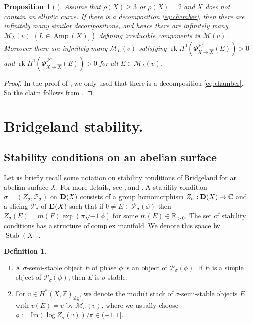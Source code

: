 \documentclass[10pt]{amsart}
\def\cal{\mathcal}
\def\Bbb{\mathbb}
\newcommand{\rk}{\operatorname{rk}}
\newcommand{\Amp}{\operatorname{Amp}}
\newcommand{\alg}{\operatorname{alg}}
\newcommand{\Stab}{\operatorname{Stab}}
\numberwithin{equation}{section}
\theoremstyle{plain}
\newtheorem{prop}[thm]{Proposition}
\theoremstyle{definition}
\newtheorem{defn}[thm]{Definition}
\theoremstyle{remark}
\begin{document}
\begin{prop}[{ \cite[Prop. 4.9]{CNY2}}]
Assume that $\rho(X) \geq 3$ or $\rho(X)=2$ and $X$ does not contain an elliptic curve.
If there is a decomposition \eqref{eq:chamber}, then
there are infinitely many similar decompositions, and hence there are infinitely many 
${\cal M}_L(v)$ $(L \in \Amp(X)_v)$ defining irreducible components 
in ${\cal M}(v)$.
Moreover there are infinitely many ${\cal M}_L(v)$ satisfying
$\rk H^0(\Phi_{X \to \widehat{X}}^{{\cal P}^{\vee}}(E))>0$ and
$\rk H^1(\Phi_{X \to \widehat{X}}^{{\cal P}^{\vee}}(E))>0$ 
for all $E \in {\cal M}_L(v)$. 
\end{prop}

\begin{proof}
In the proof of \cite[Prop. 4.9]{CNY2}, we only used that there is a decomposition \eqref{eq:chamber}.
So the claim follows from \cite{CNY2}.
\end{proof}



\section{Bridgeland stability.}\label{sect:Bridgeland}

\subsection{Stability conditions on an abelian surface}

Let us briefly recall some notation on stability conditions of Bridgeland
for an abelian surface $X$.
For more details, see \cite{Br:stability}, \cite{Br:3} and \cite{Br:4}.
A stability condition $\sigma=(Z_\sigma,{\cal P}_\sigma)$ 
on ${\bf D}(X)$
consists of a group homomorphism $Z_\sigma: {\bf D}(X) \to {\Bbb C}$
and a slicing ${\cal P}_\sigma$ of ${\bf D}(X)$ such that if
$0 \ne E \in {\cal P}_\sigma(\phi)$ then 
$Z_\sigma(E) =m(E)\exp(\pi \sqrt{-1} \phi)$ 
for some $m(E) \in {\Bbb R}_{>0}$.
The set of stability conditions has a structure of complex 
manifold.
We denote this space by $\Stab(X)$.


\begin{defn}\label{defn:B-stable}
\begin{enumerate}
\item[(1)]
A $\sigma$-semi-stable object $E$ of phase $\phi$ is
an object of  ${\cal P}_\sigma(\phi)$.
If $E$ is a simple object of ${\cal P}_\sigma(\phi)$, then
$E$ is $\sigma$-stable. 
\item[(2)]
For $v \in H^*(X,{\Bbb Z})_{\alg}$,
we denote the moduli stack of $\sigma$-semi-stable objects $E$ with 
$v(E)=v$ by ${\cal M}_\sigma(v)$,
where we usually choose 
$\phi:=\mathrm{Im}(\log Z_\sigma(v))/\pi \in (-1,1]$.
\end{enumerate}
\end{defn}  
\end{document}
